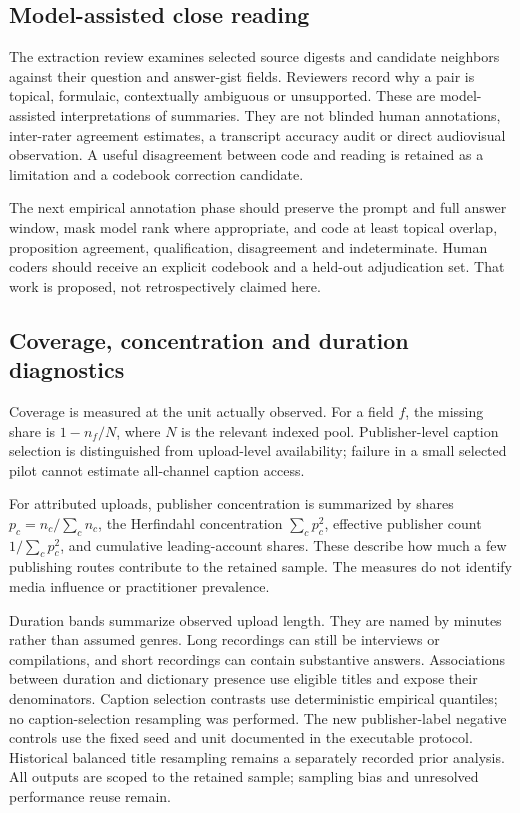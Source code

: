 \subsection{Model-assisted close reading}
The extraction review examines selected source digests and candidate neighbors against their question and answer-gist fields. Reviewers record why a pair is topical, formulaic, contextually ambiguous or unsupported. These are model-assisted interpretations of summaries. They are not blinded human annotations, inter-rater agreement estimates, a transcript accuracy audit or direct audiovisual observation. A useful disagreement between code and reading is retained as a limitation and a codebook correction candidate.

The next empirical annotation phase should preserve the prompt and full answer window, mask model rank where appropriate, and code at least topical overlap, proposition agreement, qualification, disagreement and indeterminate. Human coders should receive an explicit codebook and a held-out adjudication set. That work is proposed, not retrospectively claimed here.

\subsection{Coverage, concentration and duration diagnostics}
Coverage is measured at the unit actually observed. For a field $f$, the missing share is $1-n_f/N$, where $N$ is the relevant indexed pool. Publisher-level caption selection is distinguished from upload-level availability; failure in a small selected pilot cannot estimate all-channel caption access.

For attributed uploads, publisher concentration is summarized by shares $p_c=n_c/\sum_c n_c$, the Herfindahl concentration $\sum_c p_c^2$, effective publisher count $1/\sum_c p_c^2$, and cumulative leading-account shares. These describe how much a few publishing routes contribute to the retained sample. The measures do not identify media influence or practitioner prevalence.

Duration bands summarize observed upload length. They are named by minutes rather than assumed genres. Long recordings can still be interviews or compilations, and short recordings can contain substantive answers. Associations between duration and dictionary presence use eligible titles and expose their denominators. Caption selection contrasts use deterministic empirical quantiles; no caption-selection resampling was performed. The new publisher-label negative controls use the fixed seed and unit documented in the executable protocol. Historical balanced title resampling remains a separately recorded prior analysis. All outputs are scoped to the retained sample; sampling bias and unresolved performance reuse remain.


